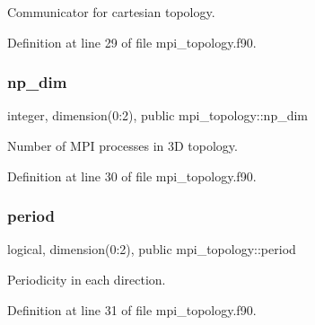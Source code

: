Communicator for cartesian topology. 



Definition at line 29 of file mpi\+\_\+topology.\+f90.

\mbox{\label{namespacempi__topology_ac837e97cb4896a72d94eb7a9f12d6682}} 
\subsubsection{\texorpdfstring{np\_dim}{np\_dim}}
{\footnotesize\ttfamily integer, dimension(0\+:2), public mpi\+\_\+topology\+::np\+\_\+dim}



Number of M\+PI processes in 3D topology. 



Definition at line 30 of file mpi\+\_\+topology.\+f90.

\mbox{\label{namespacempi__topology_ac24cb383bdfbdf566165cf78b03677aa}} 
\subsubsection{\texorpdfstring{period}{period}}
{\footnotesize\ttfamily logical, dimension(0\+:2), public mpi\+\_\+topology\+::period}



Periodicity in each direction. 



Definition at line 31 of file mpi\+\_\+topology.\+f90.

